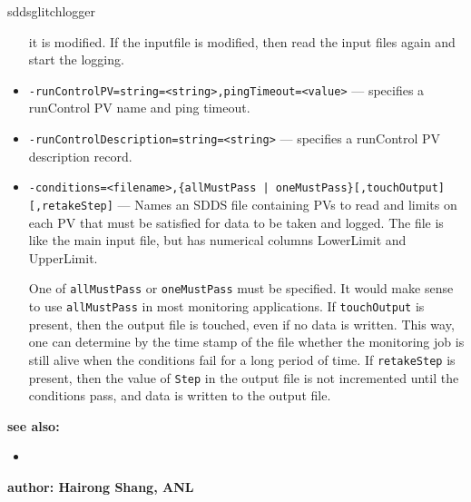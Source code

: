 \begin{sddsprog}{sddsglitchlogger}
\begin{itemize}
                it is modified. If the inputfile is modified, then read the input files again and start
                the logging.
        \item {\tt -runControlPV=string=<string>,pingTimeout=<value>} --- specifies a runControl PV name
                and ping timeout.
        \item {\tt -runControlDescription=string=<string>} --- specifies a runControl PV description record.
        \item {\verb+-conditions=<filename>,{allMustPass | oneMustPass}[,touchOutput][,retakeStep]+} ---
                   Names an SDDS file containing PVs to read and limits on each PV that must
                   be satisfied for data to be taken and logged.  The file is like the main
                   input file, but has numerical columns LowerLimit and UpperLimit.

                One of \verb+allMustPass+ or \verb+oneMustPass+ must be specified. It would make sense
                to use \verb+allMustPass+ in most monitoring applications.
                If \verb+touchOutput+ is present, then the output file is touched, even if no data
                is written. This way, one can determine by the time stamp of the file
                whether the monitoring job is still alive
                when the conditions fail for a long period of time. If \verb+retakeStep+ is
                present, then the value of \verb+Step+ in the output file is not
                incremented until the conditions pass, and data is written to the output file.
    \end{itemize}

\item {\bf see also:}
    \begin{itemize}
%
%
    \item {}
    \end{itemize}
%
%
\item {\bf author: Hairong Shang, ANL} 
\end{sddsprog}
